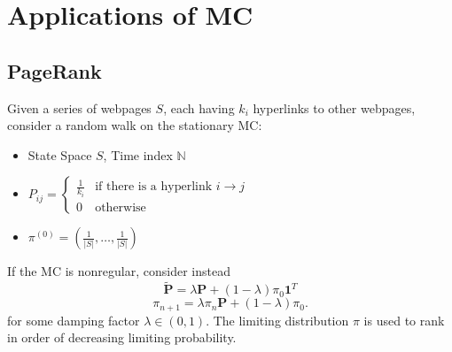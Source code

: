 \section{Applications of MC}
\subsection{PageRank}
Given a series of webpages $S$, each having $k_i$ hyperlinks to other webpages,
consider a random walk on the stationary MC:
\begin{itemize}
  \item State Space $S$, Time index $\mathbb{N}$
  \item $P_{ij}=\begin{cases}\frac{1}{k_i}&\text{if there is a hyperlink }i\to
    j\\0&\text{otherwise}\end{cases}$
  \item $\pi^{\left( 0 \right) }=\left( \frac{1}{\left| S \right|
    },\ldots,\frac{1}{\left| S \right| } \right) $
\end{itemize}
If the MC is nonregular, consider instead
\[\tilde{\mathbf{P}}=\lambda\mathbf{P}+\left( 1-\lambda \right) \pi_0
\mathbf{1}^{T}\]
\[\pi_{n+1}=\lambda\pi_{n}\mathbf{P}+\left( 1-\lambda \right) \pi_0.\]
for some damping factor $\lambda\in \left( 0,1 \right) $.  The limiting
distribution $\pi$ is used to rank in order of decreasing limiting probability.

